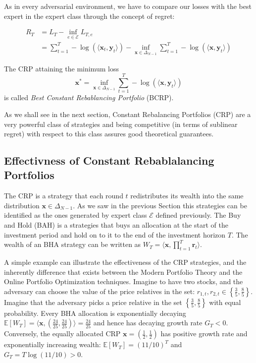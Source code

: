 As in every adversarial environment, we have to compare our losses with the best expert in the expert class through the concept of regret:

\begin{align}
R_T&=L_T-\inf\limits_{e\in \mathcal E}L_{T,e}\\
&=\sum\limits_{t=1}^T-\log(\langle\mathbf x_t,\mathbf y_t\rangle)-\inf\limits_{\mathbf x\in\Delta_{N-1}}\sum\limits_{t=1}^T-\log(\langle\mathbf x,\mathbf y_t\rangle)
\end{align}

The CRP attaining the minimum loss 
$$\mathbf x^*=\inf\limits_{\mathbf x \in \Delta_{N-1}}\sum\limits_{t=1}^T-\log(\langle\mathbf x,\mathbf y_t\rangle)$$
is called \emph{Best Constant Rebablancing Portfolio} (BCRP).

As we shall see in the next section, Constant Rebalancing Portfolios (CRP) are a very powerful class of strategies and being competitive (in terms of sublinear regret) with respect to this class assures good theoretical guarantees. 

\subsection{Effectivness of Constant Rebablalancing Portfolios}\label{sec:OPO}

The CRP is a strategy that each round $t$ redistributes its wealth into the same distribution $\mathbf x\in\Delta_{N-1}$. As we saw in the previous Section this strategies can be identified as the ones generated by expert class $\mathcal E$ defined previously.
The Buy and Hold (BAH) is a strategies that buys an allocation at the start of the investment period and hold on to it to the end of the investment horizon $T$. The wealth of an BHA strategy can be written as $W_T=\langle\mathbf x, \prod_{t=1}^T \mathbf r_t\rangle$.

A simple example can illustrate the effectiveness of the CRP strategies, and the inherently difference that exists between the Modern Portfolio Theory and the Online Portfolio Optimization techniques.
Imagine to have two stocks, and the adversary can choose the value of the price relatives in the set: $r_{1,t},r_{2,t}\in\left\{\frac{3}{5},\frac{8}{5}\right\}$. Imagine that the adversary picks a price relative in the set $\left\{\frac{3}{5},\frac{8}{5}\right\}$ with equal probability. Every BHA allocation is exponentially decaying $\mathbb E[W_T]=\langle \mathbf x, (\frac{24}{25},\frac{24}{25})\rangle=\frac{24}{25}$ and hence has decaying growth rate $G_T<0$. Conversely, the equally allocated CRP $\mathbf x=(\frac{1}{2},\frac{1}{2})$ has positive growth rate and exponentially increasing wealth: $\mathbb E[W_T]=(11/10)^T$ and $G_T=T\log(11/10)>0$.

